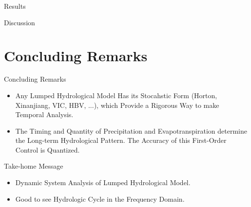 \documentclass[10pt]{beamer}
\begin{document}
\begin{frame}{Results}
 
 
\end{frame}

\begin{frame}{Discussion}

 
\end{frame}

\fi
\section{Concluding Remarks}

\begin{frame}{Concluding Remarks}
\begin{itemize}
\item \textcolor[rgb]{1,0,0}{ Any Lumped Hydrological Model} Has its \textcolor[rgb]{1,0,0}{Stocahstic Form} (Horton, Xinanjiang, VIC, HBV, ...), which \textcolor[rgb]{1,0,0}{Provide a Rigorous Way to make Temporal Analysis}. 
\item The \textcolor[rgb]{1,0,0}{Timing} and \textcolor[rgb]{1,0,0}{Quantity} of \textcolor[rgb]{1,0,0}{Precipitation and Evapotranspiration} determine the \textcolor[rgb]{1,0,0}{Long-term Hydrological Pattern}. The \textcolor[rgb]{1,0,0}{Accuracy of this First-Order Control is Quantized}. 
\end{itemize} 
 
\end{frame}

\begin{frame}{Take-home Message}
\begin{itemize}
\item Dynamic System Analysis of Lumped Hydrological Model.
\item Good to see Hydrologic Cycle in the Frequency Domain.
\end{itemize}  
 
\end{frame}
\end{document}
